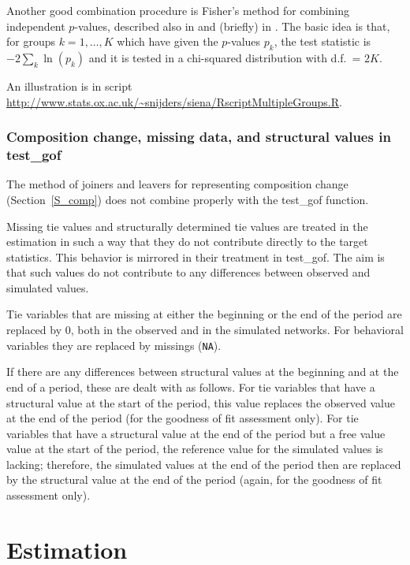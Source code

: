 \documentclass[a4paper,fleqn,11pt]{article}
\newcommand{\+}{\, + \,}
\begin{document}
Another good combination procedure is
Fisher's method for combining independent $p$-values, described also in
\citet{HedgesOlkin85} and (briefly) in \citet[Chapter 3]{SnijdersBosker12}.
The basic idea is that, for groups $k = 1, \ldots, K$
which have given the $p$-values $p_k$, the test statistic is
$- 2 \sum_k \ln(p_k)$ and it is tested in a chi-squared distribution
with d.f.\ = $2K$.

An illustration is in script \\
\url{http://www.stats.ox.ac.uk/~snijders/siena/RscriptMultipleGroups.R}.



\subsubsection{Composition change, missing data, and structural values in \textsf{test\_gof} }


The method of joiners and leavers for representing composition change
(Section~\ref{S_comp}) does not combine properly with the \textsf{test\_gof} function.


Missing tie values and structurally determined tie values are treated
in the estimation in such a way that they do not contribute directly
to the target statistics. This behavior is mirrored in their treatment
in \textsf{test\_gof}. The aim is that such values do not contribute
to any differences between observed and simulated values.

Tie variables that are missing at either the beginning or the end of the period
are replaced by 0, both in the observed and in the simulated networks.
For behavioral variables they are replaced by missings (\texttt{NA}).

If there are any differences between structural values at the beginning and
at the end of a period, these are dealt with as follows.
For tie variables that have a structural value at the start of the period,
this value replaces the observed value at the end of the period
(for the goodness of fit assessment only).
For tie variables that have a structural value at the end of the period
but a free value value at the start of the period, the reference value for
the simulated values is lacking; therefore, the simulated values at the end
of the period then are replaced by the structural value at the end of the period
(again, for the goodness of fit assessment only).


\newpage

\section{Estimation}
\label{S_Est}
\end{document}
